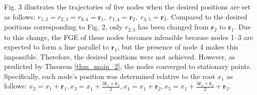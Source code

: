 \documentclass{ifacconf}
\begin{document}
Fig. 3 illustrates the trajectories of five nodes when the desired positions are set as follows:
$
r_{1,2}=r_{2,3}=r_{3,4}=\mathbf{r}_1,\; r_{1,4}=\mathbf{r}_2,\; r_{3,5}=\mathbf{r}_3.
$
Compared to the desired positions corresponding to Fig. 2, only $r_{2,3}$ has been changed from $\mathbf{r}_2$ to $\mathbf{r}_1$.
Due to this change, the FGE of these nodes becomes infeasible because nodes 1--3 are expected to form a line parallel to $\mathbf{r}_1$, but the presence of node 4 makes this impossible. Therefore, the desired positions were not achieved. However, as predicted by Theorem \ref{thm_main_2}, the nodes converged to stationary points. Specifically, each node's position was determined relative to the root $x_1$ as follows: $x_2 = x_1 + \mathbf{r}_{1}, x_3 = x_1 + \frac{3\mathbf{r}_1 + \mathbf{r}_2}{2}, x_4 = x_1 + \mathbf{r}_{2}, x_5 = x_1 + \frac{3\mathbf{r}_{1} + \mathbf{r}_{2}}{2} + \mathbf{r}_{3}.$


%
%



\end{document}
